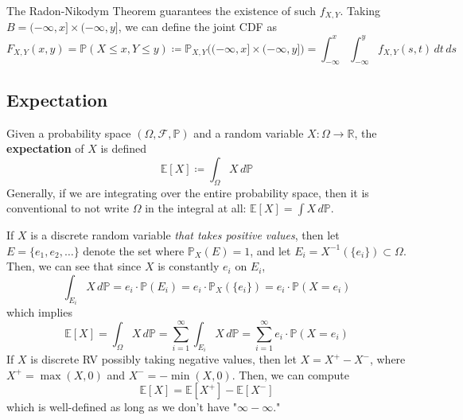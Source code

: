 \documentclass{article}
\begin{document}
      The Radon-Nikodym Theorem guarantees the existence of such $f_{X, Y}$. Taking $B = (-\infty, x] \times (-\infty, y]$, we can define the joint CDF as 
      \begin{equation}
        F_{X, Y} (x, y) = \mathbb{P}(X \leq x, Y \leq y) \coloneqq \mathbb{P}_{X, Y} \big( (-\infty, x] \times (-\infty, y] \bigg) = \int_{-\infty}^x \int_{-\infty}^y f_{X, Y} (s, t) \, dt \,ds
      \end{equation}

  \subsection{Expectation}

    \begin{definition}[Expectation]
      Given a probability space $(\Omega, \mathcal{F}, \mathbb{P})$ and a random variable $X: \Omega \longrightarrow \mathbb{R}$, the \textbf{expectation} of $X$ is defined 
      \begin{equation}
        \mathbb{E}[X] \coloneqq \int_\Omega X \, d\mathbb{P}
      \end{equation}
      Generally, if we are integrating over the entire probability space, then it is conventional to not write $\Omega$ in the integral at all: $\mathbb{E}[X] = \int X \,d\mathbb{P}$. 
    \end{definition}

    \begin{definition}
      If $X$ is a discrete random variable \textit{that takes positive values}, then let $E = \{e_1, e_2, \ldots\}$ denote the set where $\mathbb{P}_X(E) = 1$, and let $E_i = X^{-1} (\{e_i\}) \subset \Omega$. Then, we can see that since $X$ is constantly $e_i$ on $E_i$, 
      \begin{equation}
        \int_{E_i} X \, d\mathbb{P} = e_i \cdot \mathbb{P}(E_i) = e_i \cdot \mathbb{P}_X (\{e_i\}) = e_i \cdot \mathbb{P}(X = e_i)
      \end{equation}
      which implies 
      \begin{equation}
        \mathbb{E}[X] = \int_\Omega X \, d\mathbb{P} = \sum_{i=1}^\infty \int_{E_i} X \, d\mathbb{P} = \sum_{i=1}^\infty e_i \cdot \mathbb{P}(X = e_i)
      \end{equation}
      If $X$ is discrete RV possibly taking negative values, then let $X = X^+ - X^-$, where $X^+ = \max(X, 0)$ and $X^- = - \min(X, 0)$. Then, we can compute 
      \begin{equation}
        \mathbb{E}[X] = \mathbb{E}[X^+] - \mathbb{E}[X^-]
      \end{equation}
      which is well-defined as long as we don't have "$\infty - \infty$."
    \end{definition}
\end{document}
